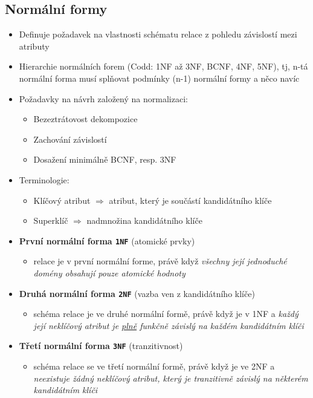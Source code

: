 \documentclass[a4paper,10pt]{article}
\newcommand{\tedy}{$\Rightarrow$ }
\begin{document}
		\subsection{Normální formy}
			\begin{itemize}
				\item Definuje požadavek na vlastnosti schématu relace z pohledu závislostí mezi atributy
				\item Hierarchie normálních forem (Codd: 1NF až 3NF, BCNF, 4NF, 5NF), tj, n-tá normální forma musí splňovat podmínky (n-1) normální formy a něco navíc
				\item Požadavky na návrh založený na normalizaci:
				\begin{itemize}
					\item Bezeztrátovost dekompozice
					\item Zachování závislostí
					\item Dosažení minimálně BCNF, resp. 3NF
				\end{itemize}
				\item Terminologie:
				\begin{itemize}
					\item Klíčový atribut \tedy atribut, který je součástí kandidátního klíče
					\item Superklíč \tedy nadmnožina kandidátního klíče
				\end{itemize}
			
				\item \textbf{První normální forma \texttt{1NF}} \hfill {\small (atomické prvky)}
				\begin{itemize}
					\item relace je v první normální forme, právě když \emph{všechny její jednoduché domény obsahují pouze atomické hodnoty}
				\end{itemize}

				\item \textbf{Druhá normální forma \texttt{2NF}} \hfill {\small (vazba ven z kandidátního klíče)}
				\begin{itemize}
					\item schéma relace je ve druhé normální formě, právě když je v 1NF a \emph{každý její neklíčový atribut je \underline{plně} funkčně závislý na každém kandidátním klíči}
				\end{itemize}

				\item \textbf{Třetí normální forma \texttt{3NF}} \hfill {\small (tranzitivnost)}
				\begin{itemize}
					\item schéma relace se ve třetí normální formě, právě když je ve 2NF a \emph{neexistuje žádný neklíčový atribut, který je tranzitivně závislý na některém kandidátním klíči}
				\end{itemize}


\end{itemize}
\end{document}
